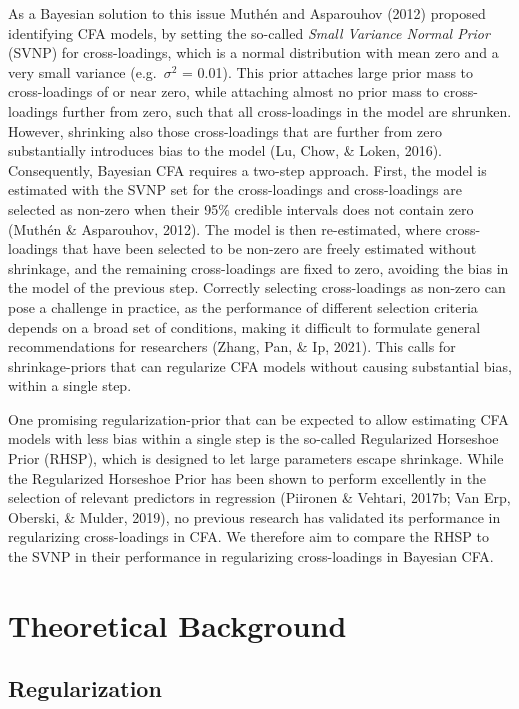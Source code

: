 \documentclass[
  man, donotrepeattitle,floatsintext]{apa6}
\begin{document}
As a Bayesian solution to this issue Muthén and Asparouhov (2012) proposed identifying CFA models, by setting the so-called \emph{Small Variance Normal Prior} (SVNP) for cross-loadings, which is a normal distribution with mean zero and a very small variance (e.g.~\(\sigma^2\) = 0.01). This prior attaches large prior mass to cross-loadings of or near zero, while attaching almost no prior mass to cross-loadings further from zero, such that all cross-loadings in the model are shrunken. However, shrinking also those cross-loadings that are further from zero substantially introduces bias to the model (Lu, Chow, \& Loken, 2016). Consequently, Bayesian CFA requires a two-step approach. First, the model is estimated with the SVNP set for the cross-loadings and cross-loadings are selected as non-zero when their 95\% credible intervals does not contain zero (Muthén \& Asparouhov, 2012). The model is then re-estimated, where cross-loadings that have been selected to be non-zero are freely estimated without shrinkage, and the remaining cross-loadings are fixed to zero, avoiding the bias in the model of the previous step. Correctly selecting cross-loadings as non-zero can pose a challenge in practice, as the performance of different selection criteria depends on a broad set of conditions, making it difficult to formulate general recommendations for researchers (Zhang, Pan, \& Ip, 2021). This calls for shrinkage-priors that can regularize CFA models without causing substantial bias, within a single step.

One promising regularization-prior that can be expected to allow estimating CFA models with less bias within a single step is the so-called Regularized Horseshoe Prior (RHSP), which is designed to let large parameters escape shrinkage. While the Regularized Horseshoe Prior has been shown to perform excellently in the selection of relevant predictors in regression (Piironen \& Vehtari, 2017b; Van Erp, Oberski, \& Mulder, 2019), no previous research has validated its performance in regularizing cross-loadings in CFA. We therefore aim to compare the RHSP to the SVNP in their performance in regularizing cross-loadings in Bayesian CFA.

\hypertarget{theoretical-background}{%
\section{Theoretical Background}\label{theoretical-background}}

\hypertarget{regularization}{%
\subsection{Regularization}\label{regularization}}
\end{document}
